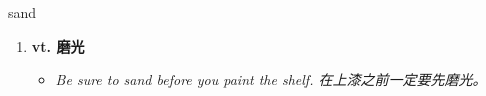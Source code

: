 
\begin{frame}
{\huge sand}
\begin{center}
\begin{enumerate}\Large
  \item \textbf{vt. 磨光}
  \begin{itemize}
    \item \em{\Large{Be sure to sand before you paint the shelf. 在上漆之前一定要先磨光。}}
  \end{itemize}
\end{enumerate}
\end{center}
\end{frame}
